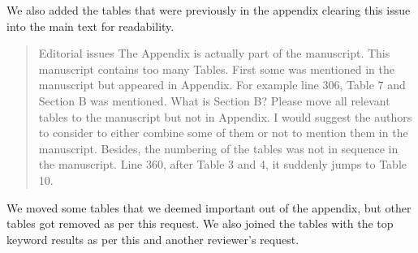 \documentclass{letter}
\begin{document}
We also added the tables that were previously in the appendix clearing this issue into the main text for readability.

\begin{quotation}
Editorial issues
The Appendix is actually part of the manuscript. This manuscript contains too many Tables. First some was mentioned in the manuscript but appeared in Appendix. For example line 306, Table 7 and Section B was mentioned. What is Section B?  Please move all relevant tables to the manuscript but not in Appendix. I would suggest the authors to consider to either combine some of them or not to mention them in the manuscript. 
Besides, the numbering of the tables was not in sequence in the manuscript. Line 360, after Table 3 and 4, it suddenly jumps to Table 10.
\end{quotation}

We moved some tables that we deemed important out of the appendix, but other tables got removed as per this request. We also joined the tables with the top keyword results as per this and another reviewer's request.
\end{document}
